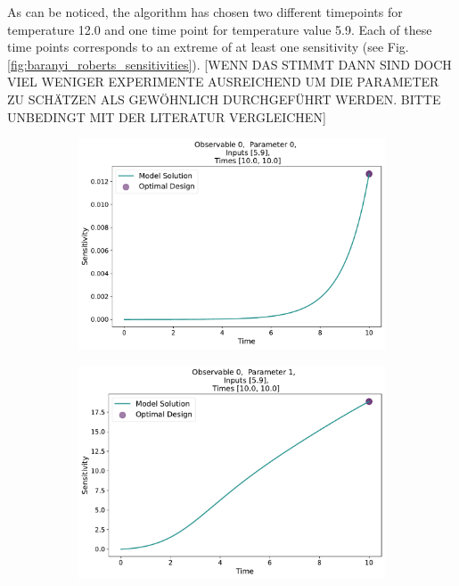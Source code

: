 \documentclass[10pt,A4paper]{article}
\begin{document}
As can be noticed, the algorithm has chosen two different timepoints for temperature 12.0 and  one time point for temperature value 5.9.
Each of these time points corresponds to an extreme of at least one sensitivity (see Fig. \ref{fig:baranyi_roberts_sensitivities}).
[WENN DAS STIMMT DANN SIND DOCH VIEL WENIGER EXPERIMENTE AUSREICHEND UM DIE PARAMETER ZU SCHÄTZEN ALS GEWÖHNLICH DURCHGEFÜHRT WERDEN. BITTE UNBEDINGT MIT DER LITERATUR VERGLEICHEN]
\begin{figure}[H]
    \begin{subfigure}{.9\textwidth}
      \centering
      \includegraphics[scale=0.35]{Figures/Sensitivity_Results_baranyi_roberts_ode_fisher_determinant_rel_sensit_cont_2times_2temps_000_x_00_p_00.pdf}
    \end{subfigure}
    \begin{subfigure}{.9\textwidth}
      \centering
      \includegraphics[scale=0.35]{Figures/Sensitivity_Results_baranyi_roberts_ode_fisher_determinant_rel_sensit_cont_2times_2temps_000_x_00_p_01.pdf}

\end{subfigure}
\end{figure}
\end{document}
